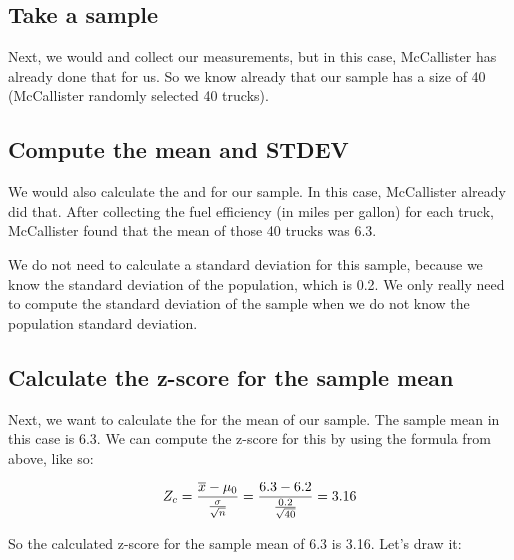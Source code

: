\documentclass[../../../main.tex]{subfiles}
\begin{document}
\subsection{Take a sample}

Next, we would  and collect our measurements, but in this case, McCallister has already done that for us. So we know already that our sample has a size of 40 (McCallister randomly selected 40 trucks).


\subsection{Compute the mean and STDEV}

We would also calculate the  and  for our sample. In this case, McCallister already did that. After collecting the fuel efficiency (in miles per gallon) for each truck, McCallister found that the mean of those 40 trucks was 6.3.

We do not need to calculate a standard deviation for this sample, because we know the standard deviation of the population, which is 0.2. We only really need to compute the standard deviation of the sample when we do not know the population standard deviation.


\subsection{Calculate the z-score for the sample mean}

Next, we want to calculate the  for the mean of our sample. The sample mean in this case is 6.3. We can compute the z-score for this by using the formula from above, like so:

\begin{equation*}
  Z_{c} = \frac{\samplemean{x} - \HypPopMean/}{\frac{\populationstdev}{\sqrt{\samplesize/}}} = \frac{6.3 - 6.2}{\frac{0.2}{\sqrt{40}}} = 3.16
\end{equation*}

\noindent
So the calculated z-score for the sample mean of 6.3 is 3.16. Let's draw it:
\end{document}
